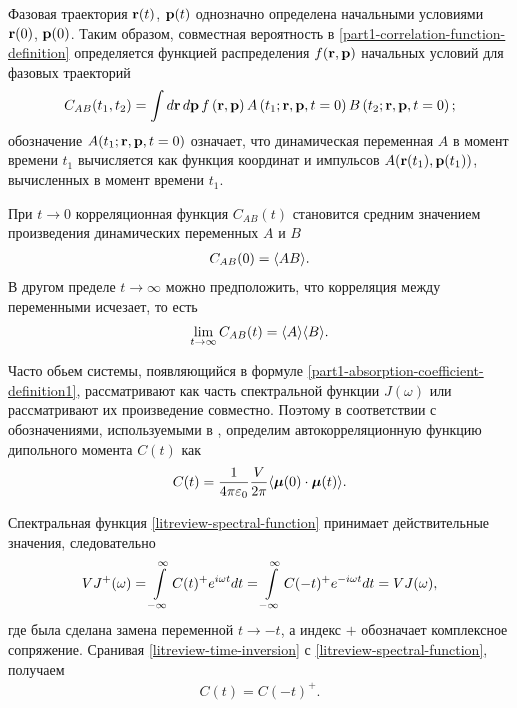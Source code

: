 Фазовая траектория $\mathbf{r}(t)$, $\mathbf{p}(t)$ однозначно определена начальными условиями $\mathbf{r}(0)$, $\mathbf{p}(0)$. Таким образом, совместная вероятность в \eqref{part1-correlation-function-definition} определяется функцией распределения $f(\mathbf{r}, \mathbf{p})$ начальных условий для фазовых траекторий
\begin{gather}
    C_{AB}(t_1, t_2) = \int d\mathbf{r} \, d\mathbf{p} \, f \left( \mathbf{r}, \mathbf{p} \right) A\left( t_1; \mathbf{r}, \mathbf{p}, t = 0 \right) B \left( t_2; \mathbf{r}, \mathbf{p}, t = 0 \right);
\end{gather}
%
обозначение $A(t_1; \mathbf{r}, \mathbf{p}, t = 0)$ означает, что динамическая переменная $A$ в момент времени $t_1$ вычисляется как функция координат и импульсов $A(\mathbf{r}(t_1), \mathbf{p}(t_1))$, вычисленных в момент времени $t_1$. \par
    При $t \rightarrow 0$ корреляционная функция $C_{AB}(t)$ становится средним значением произведения динамических переменных $A$ и $B$
\begin{gather}
    C_{AB}(0) = \langle AB \rangle.
\end{gather}
%
В другом пределе $t \rightarrow \infty$ можно предположить, что корреляция между переменными исчезает, то есть
\begin{gather}
    \lim_{t \rightarrow \infty} C_{AB}(t) = \langle A \rangle \langle B \rangle.
\end{gather}

Часто обьем системы, появляющийся в формуле \eqref{part1-absorption-coefficient-definition1}, рассматривают как часть спектральной функции $J(\omega)$ или рассматривают их произведение совместно. Поэтому в соответствии с обозначениями, используемыми в \cite{frommhold}, определим автокорреляционную функцию дипольного момента $C(t)$ как
\begin{gather}
    C(t) = \frac{1}{4 \pi \varepsilon_0} \frac{V}{2\pi} \langle \boldsymbol{\mu}(0) \cdot \boldsymbol{\mu}(t) \rangle. \label{litreview-autocorrelation-function-definition}
\end{gather}

Спектральная функция \eqref{litreview-spectral-function} принимает действительные значения, следовательно
\begin{gather}
    V J^+(\omega) = \int\limits_{-\infty}^\infty C(t)^+ e^{i \omega t} dt = \int\limits_{-\infty}^\infty C(-t)^+ e^{-i\omega t} dt = VJ(\omega), \label{litreview-time-inversion}
\end{gather}
%
где была сделана замена переменной $t \rightarrow -t$, а индекс $+$ обозначает комплексное сопряжение. Сранивая \eqref{litreview-time-inversion} с \eqref{litreview-spectral-function}, получаем
\begin{gather}
    C(t) = C(-t)^+.
\end{gather}

